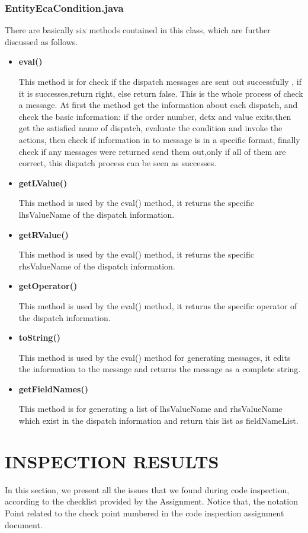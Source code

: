 \documentclass[a4paper,11pt]{article}
\begin{document}
	\subsubsection{EntityEcaCondition.java}
	There are basically six methods contained in this class, which are further discussed as follows.
	\begin{itemize}
	\item \textbf{eval()}
	
	This method is for check if the dispatch messages are sent out successfully , if it is successes,return right, else return false. This is the whole process of check a message. At first the method get the information about each dispatch, and check the basic information: if the order number, dctx and value exits,then get the satisfied name of dispatch, evaluate the condition and invoke the actions, then check if information in to message is in a specific format, finally check if any messages were returned send them out,only if all of them are correct, this dispatch process can be seen as successes.
	
	\item \textbf{getLValue()}
	
	This method is used by the eval() method, it returns the specific lhsValueName of the dispatch information.
	
	\item \textbf{getRValue()}
	
	This method is used by the eval() method, it returns the specific rhsValueName of the dispatch information.
	
	\item \textbf{getOperator()}
	
	This method is used by the eval() method, it returns the specific operator of the dispatch information.
	\item \textbf{toString()} 
	
This method is used by the eval() method for generating messages, it edits the information to the message and returns the message as a complete string.

	\item \textbf{getFieldNames()}
	
	This method is for generating a list of lhsValueName and rhsValueName which exist in the dispatch information and return this list as fieldNameList.
	\end{itemize}
	

	
\newpage
\section{INSPECTION RESULTS}
In this section, we present all the issues that we found during code inspection, according to the checklist provided by the Assignment. Notice that, the notation Point related to the check point numbered in the code inspection assignment document. 
\end{document}
